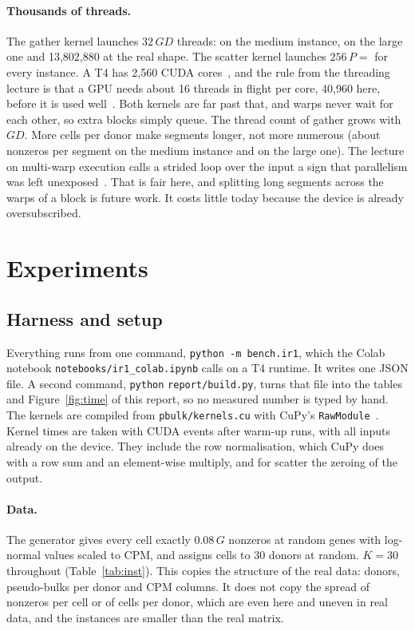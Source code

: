 \documentclass[sigconf,nonacm]{acmart}
\newcommand{\code}[1]{\texttt{#1}}
\newcommand{\file}[1]{{\urlstyle{tt}\nolinkurl{#1}}}   %
\begin{document}
\paragraph{Thousands of threads.} The gather kernel launches $32\,GD$ threads: \ThreadsMedium{} on
the medium instance, \ThreadsLarge{} on the large one and 13,802,880 at the real shape. The scatter
kernel launches $256\,P = $ \ScatterThreads{} for every instance. A T4 has 2,560 CUDA
cores~\cite{t4datasheet}, and the rule from the threading lecture is that a GPU needs about 16
threads in flight per core, 40,960 here, before it is used well~\cite{csc586f}. Both kernels are far
past that, and warps never wait for each other, so extra blocks simply queue. The thread count of
gather grows with $GD$. More cells per donor make segments longer, not more numerous (about
\SegLenMedium{} nonzeros per segment on the medium instance and \SegLenLarge{} on the large one).
The lecture on multi-warp execution calls a strided loop over the input a sign that parallelism was
left unexposed~\cite{csc586f}. That is fair here, and splitting long segments across the warps of a
block is future work. It costs little today because the device is already oversubscribed.

\section{Experiments}
\label{sec:exp}

\subsection{Harness and setup}

Everything runs from one command, \code{python -m bench.ir1}, which the Colab notebook
\file{notebooks/ir1_colab.ipynb} calls on a T4 runtime. It writes one JSON file. A second command,
\code{python} \file{report/build.py}, turns that file into the tables and Figure~\ref{fig:time} of this
report, so no measured number is typed by hand. The kernels are compiled from
\file{pbulk/kernels.cu} with CuPy's \code{RawModule}~\cite{okuta2017}. Kernel times are taken with CUDA events after
warm-up runs, with all inputs already on the device. They include the row normalisation, which CuPy
does with a row sum and an element-wise multiply, and for scatter the zeroing of the output.

\paragraph{Data.} The generator gives every cell exactly $0.08\,G$ nonzeros at random genes with
log-normal values scaled to CPM, and assigns cells to 30 donors at random. $K = 30$ throughout
(Table~\ref{tab:inst}). This copies the structure of the real data: donors, pseudo-bulks per donor
and CPM columns. It does not copy the spread of nonzeros per cell or of cells per donor, which are
even here and uneven in real data, and the instances are smaller than the real matrix.
\end{document}
